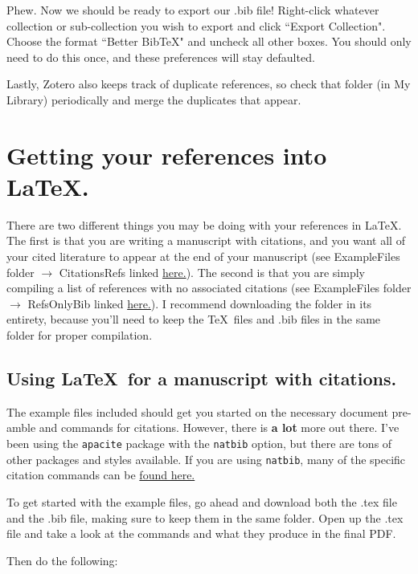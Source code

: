 \documentclass[11pt]{article}
\begin{document}
Phew. Now we should be ready to export our .bib file! Right-click whatever collection or sub-collection you wish to export and click ``Export Collection". Choose the format ``Better BibTeX" and uncheck all other boxes. You should only need to do this once, and these preferences will stay defaulted. 

Lastly, Zotero also keeps track of duplicate references, so check that folder (in My Library) periodically and merge the duplicates that appear.

\section{Getting your references into \LaTeX.}

There are two different things you may be doing with your references in \LaTeX. The first is that you are writing a manuscript with citations, and you want all of your cited literature to appear at the end of your manuscript (see ExampleFiles folder $\rightarrow$ CitationsRefs linked \href{https://github.com/ledelaney/BibTeXforBrownLab/tree/master/ExampleFiles/CitationsRefs}{here.}). The second is that you are simply compiling a list of references with no associated citations (see ExampleFiles folder $\rightarrow$ RefsOnlyBib linked \href{https://github.com/ledelaney/BibTeXforBrownLab/tree/master/ExampleFiles/RefsOnlyBib}{here.}). I recommend downloading the folder in its entirety, because you'll need to keep the \TeX\ files and .bib files in the same folder for proper compilation.

\subsection{Using \LaTeX\ for a manuscript with citations.}
The example files included should get you started on the necessary document pre-amble and commands for citations. However, there is \textbf{a lot} more out there. I've been using the \verb|apacite| package with the \verb|natbib| option, but there are tons of other packages and styles available. If you are using \verb|natbib|, many of the specific citation commands can be \href{https://gking.harvard.edu/files/natbib2.pdf}{found here.}

To get started with the example files, go ahead and download both the .tex file and the .bib file, making sure to keep them in the same folder. Open up the .tex file and take a look at the commands and what they produce in the final PDF.

\pagebreak
Then do the following:
\end{document}
